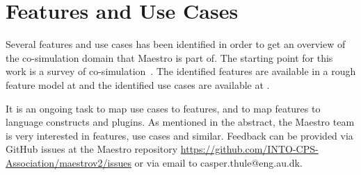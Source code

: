 \section{Features and Use Cases}\label{sec:features_use-cases}
Several features and use cases has been identified in order to get an overview
of the co-simulation domain that Maestro is part of. The starting point for this
work is a survey of co-simulation~\cite{cosim-survey}. The identified features are
available in a rough feature model at \url{} and the identified use cases are available at \url{}.

It is an ongoing task to map use cases to features, and to map features to
language constructs and plugins.
As mentioned in the abstract, the Maestro team is very interested in features,
use cases and similar. Feedback can be provided via GitHub issues at the Maestro
repository \url{https://github.com/INTO-CPS-Association/maestrov2/issues} or via email to casper.thule@eng.au.dk.
